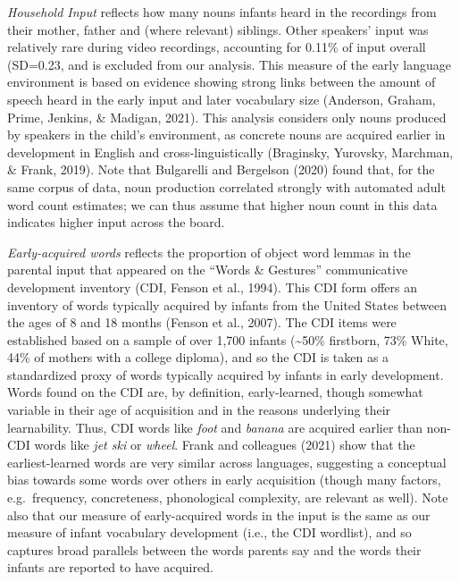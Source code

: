 \documentclass[
  english,
  man,floatsintext]{apa6}
\begin{document}
\emph{Household Input} reflects how many nouns infants heard in the recordings from their mother, father and (where relevant) siblings. Other speakers' input was relatively rare during video recordings, accounting for 0.11\% of input overall (SD=0.23, and is excluded from our analysis. This measure of the early language environment is based on evidence showing strong links between the amount of speech heard in the early input and later vocabulary size (Anderson, Graham, Prime, Jenkins, \& Madigan, 2021). This analysis considers only nouns produced by speakers in the child's environment, as concrete nouns are acquired earlier in development in English and cross-linguistically (Braginsky, Yurovsky, Marchman, \& Frank, 2019). Note that Bulgarelli and Bergelson (2020) found that, for the same corpus of data, noun production correlated strongly with automated adult word count estimates; we can thus assume that higher noun count in this data indicates higher input across the board.

\emph{Early-acquired words} reflects the proportion of object word lemmas in the parental input that appeared on the \enquote{Words \& Gestures} communicative development inventory (CDI, Fenson et al., 1994). This CDI form offers an inventory of words typically acquired by infants from the United States between the ages of 8 and 18 months (Fenson et al., 2007). The CDI items were established based on a sample of over 1,700 infants (\textasciitilde50\% firstborn, 73\% White, 44\% of mothers with a college diploma), and so the CDI is taken as a standardized proxy of words typically acquired by infants in early development. Words found on the CDI are, by definition, early-learned, though somewhat variable in their age of acquisition and in the reasons underlying their learnability. Thus, CDI words like \emph{foot} and \emph{banana} are acquired earlier than non-CDI words like \emph{jet ski} or \emph{wheel}. Frank and colleagues (2021) show that the earliest-learned words are very similar across languages, suggesting a conceptual bias towards some words over others in early acquisition (though many factors, e.g.~frequency, concreteness, phonological complexity, are relevant as well). Note also that our measure of early-acquired words in the input is the same as our measure of infant vocabulary development (i.e., the CDI wordlist), and so captures broad parallels between the words parents say and the words their infants are reported to have acquired.
\end{document}
